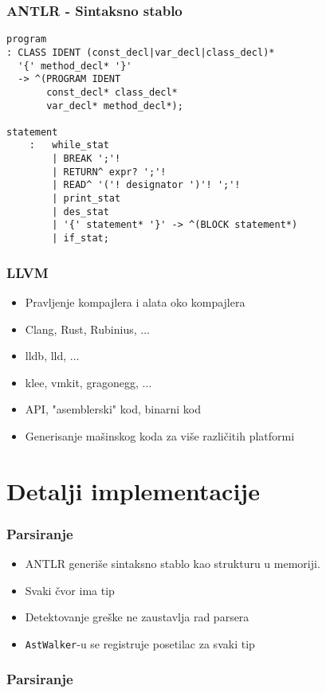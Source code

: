 \documentclass{beamer}
\newcommand{\code}[1]{\texttt{#1}}
\begin{document}
\begin{frame}[fragile]
	\frametitle{ANTLR - Sintaksno stablo}
	
	\begin{lstlisting}
program 
: CLASS IDENT (const_decl|var_decl|class_decl)*
  '{' method_decl* '}'
  -> ^(PROGRAM IDENT
       const_decl* class_decl*
       var_decl* method_decl*);

statement
    :   while_stat
        | BREAK ';'!
        | RETURN^ expr? ';'!
        | READ^ '('! designator ')'! ';'!
        | print_stat
        | des_stat
        | '{' statement* '}' -> ^(BLOCK statement*)
        | if_stat;
	\end{lstlisting}
	

\end{frame}


\begin{frame}
	\frametitle{LLVM}
	\begin{itemize}
		\item Pravljenje kompajlera i alata oko kompajlera
		\item Clang, Rust, Rubinius, $\ldots$
		\item lldb, lld, $\ldots$
		\item klee, vmkit, gragonegg, $\ldots$
		\item API, "asemblerski" kod, binarni kod
		\item Generisanje mašinskog koda za više različitih platformi
	\end{itemize}
\end{frame}

\section{Detalji implementacije}
\begin{frame}
	\frametitle{Parsiranje}
	\begin{itemize}
		\item ANTLR generiše sintaksno stablo kao strukturu u memoriji.
		\item Svaki čvor ima tip
		\item Detektovanje greške ne zaustavlja rad parsera
		\item \code{AstWalker}-u se registruje posetilac za svaki tip
	\end{itemize}
\end{frame}


\begin{frame}[c]
	\frametitle{Parsiranje}
\begin{center}

	\scalebox{0.6}{
		
	}
\end{center}
\end{frame}
\end{document}
